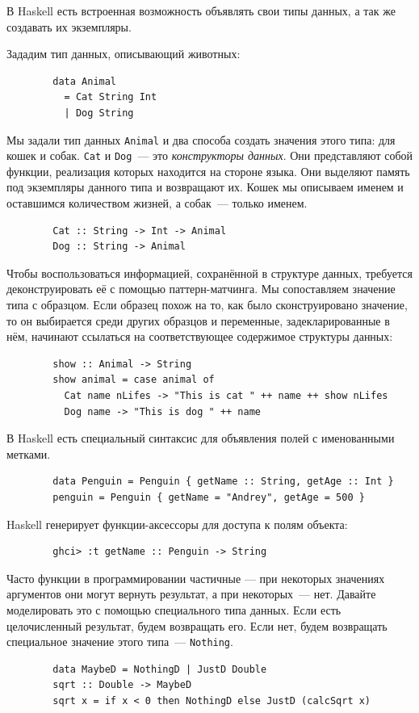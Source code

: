 \documentclass[12pt]{article}
\newcommand{\point}[1]{{\color{blue}\textit{#1}}} %
\begin{document}
    В Haskell есть встроенная возможность объявлять свои типы данных, а так же создавать их экземпляры.

    Зададим тип данных, описывающий животных:
    \begin{verbatim}
        data Animal
          = Cat String Int
          | Dog String
    \end{verbatim}

    Мы задали тип данных \texttt{Animal} и два способа создать значения этого типа: для кошек и собак.
    \texttt{Cat} и \texttt{Dog}~--- это \point{конструкторы данных}.
    Они представляют собой функции, реализация которых находится на стороне языка.
    Они выделяют память под экземпляры данного типа и возвращают их.
    Кошек мы описываем именем и оставшимся количеством жизней, а собак~--- только именем.
    \begin{verbatim}
        Cat :: String -> Int -> Animal
        Dog :: String -> Animal
    \end{verbatim}

    Чтобы воспользоваться информацией, сохранённой в структуре данных, требуется деконструировать её с помощью паттерн-матчинга.
    Мы сопоставляем значение типа с образцом.
    Если образец похож на то, как было сконструировано значение, то он выбирается среди других образцов и переменные, задекларированные в нём, начинают ссылаться на соответствующее содержимое структуры данных:
    \begin{verbatim}
        show :: Animal -> String
        show animal = case animal of
          Cat name nLifes -> "This is cat " ++ name ++ show nLifes
          Dog name -> "This is dog " ++ name
    \end{verbatim}

    В Haskell есть специальный синтаксис для объявления полей с именованными метками.
    \begin{verbatim}
        data Penguin = Penguin { getName :: String, getAge :: Int }
        penguin = Penguin { getName = "Andrey", getAge = 500 }
    \end{verbatim}
    Haskell генерирует функции-аксессоры для доступа к полям объекта:
    \begin{verbatim}
        ghci> :t getName :: Penguin -> String
    \end{verbatim}

    Часто функции в программировании частичные --- при некоторых значениях аргументов они могут вернуть результат, а при некоторых~--- нет.
    Давайте моделировать это с помощью специального типа данных.
    Если есть целочисленный результат, будем возвращать его.
    Если нет, будем возвращать специальное значение этого типа~--- \texttt{Nothing}.
    \begin{verbatim}
        data MaybeD = NothingD | JustD Double
        sqrt :: Double -> MaybeD
        sqrt x = if x < 0 then NothingD else JustD (calcSqrt x)
    \end{verbatim}
\end{document}
